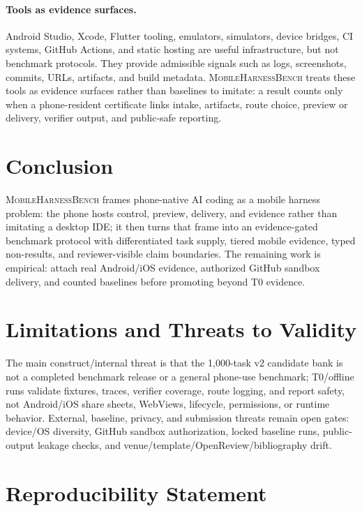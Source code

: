 \documentclass{article}
\newcommand{\mhb}{\textsc{MobileHarnessBench}}
\begin{document}
\paragraph{Tools as evidence surfaces.}
Android Studio, Xcode, Flutter tooling, emulators, simulators, device bridges, CI systems, GitHub Actions, and static hosting are useful infrastructure, but not benchmark protocols.
They provide admissible signals such as logs, screenshots, commits, URLs, artifacts, and build metadata.
\mhb{} treats these tools as evidence surfaces rather than baselines to imitate: a result counts only when a phone-resident certificate links intake, artifacts, route choice, preview or delivery, verifier output, and public-safe reporting.

\section{Conclusion}

\mhb{} frames phone-native AI coding as a mobile harness problem: the phone hosts control, preview, delivery, and evidence rather than imitating a desktop IDE; it then turns that frame into an evidence-gated benchmark protocol with differentiated task supply, tiered mobile evidence, typed non-results, and reviewer-visible claim boundaries. The remaining work is empirical: attach real Android/iOS evidence, authorized GitHub sandbox delivery, and counted baselines before promoting beyond T0 evidence.

\section{Limitations and Threats to Validity}

The main construct/internal threat is that the 1,000-task v2 candidate bank is not a completed benchmark release or a general phone-use benchmark; T0/offline runs validate fixtures, traces, verifier coverage, route logging, and report safety, not Android/iOS share sheets, WebViews, lifecycle, permissions, or runtime behavior.
External, baseline, privacy, and submission threats remain open gates: device/OS diversity, GitHub sandbox authorization, locked baseline runs, public-output leakage checks, and venue/template/OpenReview/bibliography drift.

\section{Reproducibility Statement}
\end{document}

